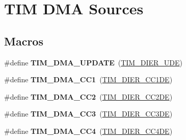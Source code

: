 \hypertarget{group___t_i_m___d_m_a__sources}{}\section{T\+IM D\+MA Sources}
\label{group___t_i_m___d_m_a__sources}
\subsection*{Macros}
\begin{DoxyCompactItemize}
\item 
\mbox{\label{group___t_i_m___d_m_a__sources_ga45816ad15a4f533027eb202ac0b9aaf5}} 
\#define {\bfseries T\+I\+M\+\_\+\+D\+M\+A\+\_\+\+U\+P\+D\+A\+TE}~(\hyperlink{group___peripheral___registers___bits___definition_gab9f47792b1c2f123464a2955f445c811}{T\+I\+M\+\_\+\+D\+I\+E\+R\+\_\+\+U\+DE})
\item 
\mbox{\label{group___t_i_m___d_m_a__sources_ga33b93e8bb82fe8e167b9e9c962c54f83}} 
\#define {\bfseries T\+I\+M\+\_\+\+D\+M\+A\+\_\+\+C\+C1}~(\hyperlink{group___peripheral___registers___bits___definition_gae181bb16ec916aba8ba86f58f745fdfd}{T\+I\+M\+\_\+\+D\+I\+E\+R\+\_\+\+C\+C1\+DE})
\item 
\mbox{\label{group___t_i_m___d_m_a__sources_ga792f73196a8e7424655592097d7a3fd5}} 
\#define {\bfseries T\+I\+M\+\_\+\+D\+M\+A\+\_\+\+C\+C2}~(\hyperlink{group___peripheral___registers___bits___definition_ga58f97064991095b28c91028ca3cca28e}{T\+I\+M\+\_\+\+D\+I\+E\+R\+\_\+\+C\+C2\+DE})
\item 
\mbox{\label{group___t_i_m___d_m_a__sources_ga3eb2dadbd3109bced45935fb53deeee1}} 
\#define {\bfseries T\+I\+M\+\_\+\+D\+M\+A\+\_\+\+C\+C3}~(\hyperlink{group___peripheral___registers___bits___definition_ga1567bff5dc0564b26a8b3cff1f0fe0a4}{T\+I\+M\+\_\+\+D\+I\+E\+R\+\_\+\+C\+C3\+DE})
\item 
\mbox{\label{group___t_i_m___d_m_a__sources_ga59495cf79894dfe5e5b2029863aed956}} 
\#define {\bfseries T\+I\+M\+\_\+\+D\+M\+A\+\_\+\+C\+C4}~(\hyperlink{group___peripheral___registers___bits___definition_gaaba034412c54fa07024e516492748614}{T\+I\+M\+\_\+\+D\+I\+E\+R\+\_\+\+C\+C4\+DE})

\end{DoxyCompactItemize}
